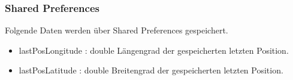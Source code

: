 \subsubsection{Shared Preferences}
Folgende Daten werden über Shared Preferences gespeichert.
\begin{itemize}
    \item lastPosLongitude : double Längengrad der gespeicherten letzten Position.
    \item lastPosLatitude : double Breitengrad der gespeicherten letzten Position.
\end{itemize}